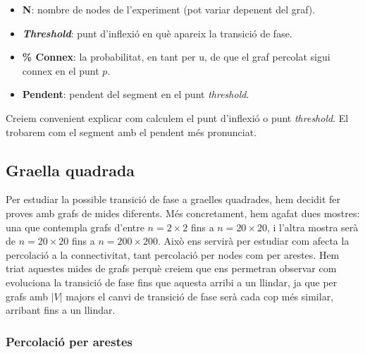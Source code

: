 \documentclass[a4paper]{article}
\begin{document}
	\begin{itemize}
		\item \textbf{N}: nombre de nodes de l'experiment (pot variar depenent del graf).
		\item \textbf{\textit{Threshold}}: punt d'inflexió en què apareix la transició de fase.
		\item \textbf{\% Connex}: la probabilitat, en tant per u, de que el graf percolat sigui connex en el punt $p$.
		\item \textbf{Pendent}: pendent del segment en el punt \textit{threshold}.
	\end{itemize}
	
	Creiem convenient explicar com calculem el punt d'inflexió o punt \textit{threshold}. El trobarem com el segment amb el pendent més pronunciat.
	
	\subsection{Graella quadrada}
	
	Per estudiar la possible transició de fase a graelles quadrades, hem decidit fer proves amb grafs de mides diferents. Més concretament, hem agafat dues mostres: una que contempla grafs d'entre $n = 2 \times 2$ fins a $n = 20 \times 20$, i l'altra mostra serà de $n = 20 \times 20$ fins a $n = 200 \times 200$. Això ens servirà per estudiar com afecta la percolació a la connectivitat, tant percolació per nodes com per arestes. Hem triat aquestes mides de grafs perquè creiem que ens permetran observar com evoluciona la transició de fase fins que aquesta arribi a un llindar, ja que per grafs amb $|V|$ majors el canvi de transició de fase serà cada cop més similar, arribant fins a un llindar.
	
	\subsubsection{Percolació per arestes}
	
\end{document}
